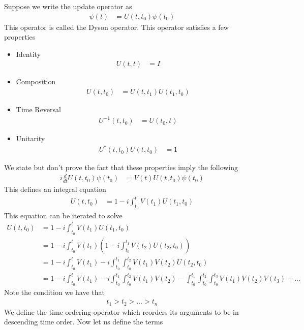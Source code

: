 \documentclass[book.tex]{subfiles}
\begin{document}
Suppose we write the update operator as
\begin{align}
    \psi(t) &= U(t, t_0) \psi(t_0)
\end{align}
This operator is called the Dyson operator. This operator satisfies a few properties
\begin{itemize}
    \item Identity 
    \begin{align}
        U(t, t) &= I
    \end{align}
    \item Composition
    \begin{align}
        U(t, t_0) &= U(t, t_1) U(t_1, t_0)
    \end{align}
    \item Time Reversal
    \begin{align}
        U^{-1}(t, t_0) &= U(t_0, t)
    \end{align}
    \item Unitarity
    \begin{align}
        U^\dagger(t, t_0) U(t, t_0) &= 1
    \end{align}
\end{itemize}
We state but don't prove the fact that these properties imply the following
\begin{align}
    i\frac{d}{dt}U(t, t_0) \psi(t_0) &= V(t)U(t, t_0) \psi(t_0)
\end{align}
This defines an integral equation
\begin{align}
    U(t, t_0) &= 1 - i\int_{t_0}^t V(t_1) U(t_1, t_0)
\end{align}
This equation can be iterated to solve
\begin{align}
    U(t, t_0) &= 1 - i\int_{t_0}^t V(t_1) U(t_1, t_0) \\
    &= 1 -i\int_{t_0}^t V(t_1)\left (1 - i \int_{t_0}^{t_1} V(t_2)U(t_2, t_0) \right ) \\
     &= 1 -i\int_{t_0}^t V(t_1) - i \int_{t_0}^{t_1} \int_{t_0}^{t_2} V(t_1)V(t_2)U(t_2, t_0)  \\
    &= 1 -i\int_{t_0}^t V(t_1) - i \int_{t_0}^{t_1} \int_{t_0}^{t_2} V(t_1)V(t_2) - \int_{t_0}^{t_1}\int^{t_2}_{t_0} \int^{t_3}_{t_0} V(t_1)V(t_2)V(t_3) + \dotsc 
\end{align}
Note the condition we have that
\begin{align}
    t_1 > t_2 > \dotsc > t_n
\end{align}
We define the time ordering operator which reorders its arguments to be in descending time order. Now let us define the terms
\end{document}
